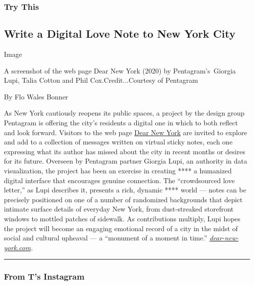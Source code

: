 \hypertarget{try-this}{%
\subsubsection{Try This}\label{try-this}}

\hypertarget{write-a-digital-love-note-to-new-york-city}{%
\subsection{Write a Digital Love Note to New York
City}\label{write-a-digital-love-note-to-new-york-city}}

Image

A screenshot of the web page Dear New York (2020) by Pentagram's~Giorgia
Lupi, Talia Cotton and Phil Cox.Credit...Courtesy of Pentagram

By Flo Wales Bonner

As New York cautiously reopens its public spaces, a project by the
design group Pentagram is offering the city's residents a digital one in
which to both reflect and look forward. Visitors to the web page
\href{https://dear-new-york.com/}{Dear New York} are invited to explore
and add to a collection of messages written on virtual sticky notes,
each one expressing what its author has missed about the city in recent
months or desires for its future. Overseen by Pentagram partner Giorgia
Lupi, an authority in data visualization, the project has been an
exercise in creating **** a humanized digital interface that encourages
genuine connection. The ``crowdsourced love letter,'' as Lupi describes
it, presents a rich, dynamic **** world --- notes can be precisely
positioned on one of a number of randomized backgrounds that depict
intimate surface details of everyday New York, from dust-streaked
storefront windows to mottled patches of sidewalk. As contributions
multiply, Lupi hopes the project will become an engaging emotional
record of a city in the midst of social and cultural upheaval --- a
``monument of a moment in time.''
\href{https://dear-new-york.com/}{\emph{dear-new-york.com}}\emph{.}

\begin{center}\rule{0.5\linewidth}{\linethickness}\end{center}

\hypertarget{from-ts-instagram}{%
\subsubsection{From T's Instagram}\label{from-ts-instagram}}

